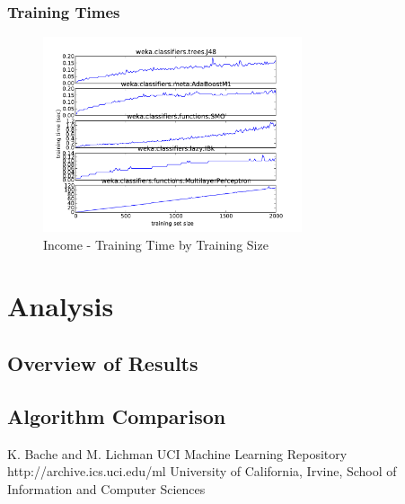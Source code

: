 \documentclass{sig-alternate}
\begin{document}
\subsubsection{Training Times}

\begin{figure}[!htbp]
    \centering
    \includegraphics[width=3in]{data/adult/learning-curve-10to2000/runtime.pdf}
    \caption{Income - Training Time by Training Size \label{ad-runtime}}
\end{figure} 

\section{Analysis}

\subsection{Overview of Results}

\subsection{Algorithm Comparison}





\begin{thebibliography}{10}

K. Bache and M. Lichman
\newblock UCI Machine Learning Repository
\newblock http://archive.ics.uci.edu/ml
\newblock University of California, Irvine, School of Information and Computer Sciences


\end{thebibliography}
\end{document}
